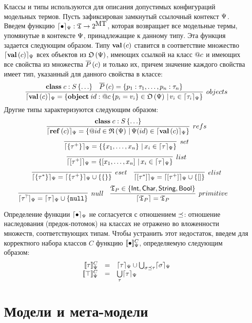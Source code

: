 Классы и типы используются для описания допустимых конфигураций модельных термов. Пусть зафиксирован замкнутый ссылочный контекст $\Psi$. Введем функцию $\lceil \bullet \rceil_\Psi : \mathfrak{T} \rightarrow 2^{\mbox{MT}}$, которая возвращает все модельные термы, упомянутые в контексте $\Psi$, принадлежащие к данному типу. Эта функция задается следующим образом. Типу $\mathbf{val}\left(c\right)$ ставится в соответствие множество $\lceil \mathbf{val}\left(c\right) \rceil_\Psi$ всех объектов из $\mathfrak{O}\left(\Psi\right)$, имеющих ссылкой на класс $@c$ и имеющих все свойства из множества $\overline{P}\left(c\right)$ и только их, причем значение каждого свойства имеет тип, указанный для данного свойства в классе:
$$
\infer[objects]{
	\semRC{\ClassT{c}} = \left\{
		\Object{id}{\Ref{c}}{p_i = v_i} \in \Objects{\RContext}
		\,|\,
		v_i \in \semRC{\tau_i} 
	\right\}
}{
	\Class{c}{S}{\ldots}&
	\AllProps{c} = \left\{p_1 : \tau_1, \ldots, p_n : \tau_n\right\}
}
$$ 
Другие типы характеризуются следующим образом:
$$
\infer[refs]{
	\semRC{\RefT{c}} = \left\{ \Ref{id} \in \Refs{\RContext} \,|\, \RContext(id) \in \semRC{\ClassT{c}} \right\}
}{
	\Class{c}{S}{\ldots}
}
$$ $$
\infer[set]{
	\semRC{\SetT{\tau^+}} = \left\{ \Set{x_1,\ldots,x_n} \,|\, x_i \in \semRC{\tau}\right\}
}{
}
$$ $$
\infer[list]{
	\semRC{\ListT{\tau^+}} = \left\{ \List{x_1,\ldots,x_n} \,|\, x_i \in \semRC{\tau}\right\}
}{
}
$$ $$
\infer[eset]{
	\semRC{\SetT{\tau^*}} = \semRC{\SetT{\tau^+}} \cup \left\{ \Set{} \right\}
}{}	
\quad
\infer[elist]{
	\semRC{\ListT{\tau^*}} = \semRC{\ListT{\tau^+}} \cup \left\{ \List{} \right\}
}{}	
$$ $$
\infer[null]{
	\semRC{\NullableT{\tau}} = \semRC{\tau} \cup \{\Null\}
}{
}
\quad
\infer[primitive]{
	\sem{\Types_P} = \Types_P
}{
	\Types_P \in \{\IntegerT, \CharT, \StringT, \BooleanT\}
}
\quad
$$

Определение функции $\lceil \bullet \rceil_\Psi$ не согласуется с отношением $\preceq$: отношение наследования (предок-потомок) на классах не отражено во вложенности множеств, соответствующих типам. Чтобы устранить этот недостаток, введем для корректного набора классов $C$ функцию $[\![\bullet]\!]_\Psi^C$, определяемую следующим образом:
$$
\begin{array}{rcl}
	\denotRCC{\tau} &=& \semRC{\tau} \cup \bigcup_{\sigma \subtype \tau} \semRC{\sigma}\\
	\denotRCC{\top} &=& \bigcup\limits_\tau \semRC{\tau}\\
\end{array}	
$$

\section{Модели и мета-модели}

